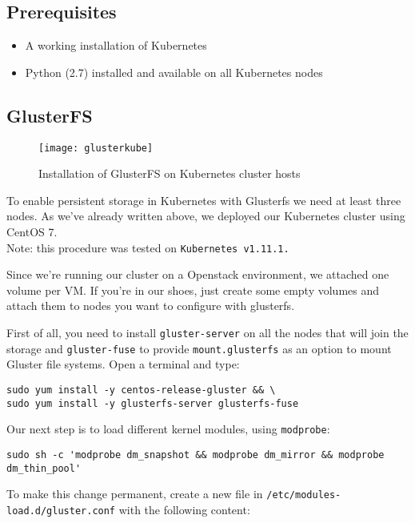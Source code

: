 \subsection{Prerequisites}\label{prerequisites}

\begin{itemize}
\item A working installation of Kubernetes
\item Python (2.7) installed and available on all Kubernetes nodes
\end{itemize}

\subsection{GlusterFS}\label{glusterfs}

\begin{figure}[htbp]
\centering
\texttt{[image: glusterkube]}
\caption{Installation of GlusterFS on Kubernetes cluster hosts}
\end{figure}

To enable persistent storage in Kubernetes with Glusterfs we need at
least three nodes. As we've already written above, we deployed our
Kubernetes cluster using CentOS 7.\\
Note: this procedure was tested on \texttt{Kubernetes\ v1.11.1.}

Since we're running our cluster on a Openstack environment, we attached
one volume per VM. If you're in our shoes, just create some empty
volumes and attach them to nodes you want to configure with glusterfs.

First of all, you need to install \texttt{gluster-server} on all the
nodes that will join the storage and \texttt{gluster-fuse} to provide
\texttt{mount.glusterfs} as an option to mount Gluster file systems.
Open a terminal and type:

\begin{lstlisting}
sudo yum install -y centos-release-gluster && \
sudo yum install -y glusterfs-server glusterfs-fuse
\end{lstlisting}

Our next step is to load different kernel modules, using
\texttt{modprobe}:

\begin{lstlisting}
sudo sh -c 'modprobe dm_snapshot && modprobe dm_mirror && modprobe dm_thin_pool'
\end{lstlisting}

To make this change permanent, create a new file in
\texttt{/etc/modules-load.d/gluster.conf} with the following content:

